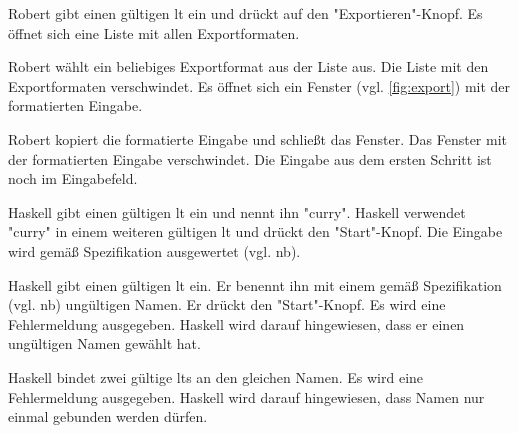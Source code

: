 \documentclass[parskip=full,11pt,twoside]{scrartcl}
\begin{document}

{Robert gibt einen gültigen \gls{lt} ein und drückt auf den "Exportieren"-Knopf.}
{Es öffnet sich eine Liste mit allen Exportformaten.}

{Robert wählt ein beliebiges Exportformat aus der Liste aus.}
{Die Liste mit den Exportformaten verschwindet.
Es öffnet sich ein Fenster (vgl. \cref{fig:export}) mit der formatierten Eingabe.}

{Robert kopiert die formatierte Eingabe und schließt das Fenster.}
{Das Fenster mit der formatierten Eingabe verschwindet. 
 Die Eingabe aus dem ersten Schritt ist noch im Eingabefeld.}
 

{Haskell gibt einen gültigen \gls{lt} ein und nennt ihn "curry".
 Haskell verwendet "curry" in einem weiteren gültigen \gls{lt} und drückt den "Start"-Knopf.}
{Die Eingabe wird gemäß Spezifikation ausgewertet (vgl. \gls{nb}).}

{Haskell gibt einen gültigen \gls{lt} ein.
 Er benennt ihn mit einem gemäß Spezifikation (vgl. \gls{nb}) ungültigen Namen.
 Er drückt den "Start"-Knopf.}
{Es wird eine Fehlermeldung ausgegeben.
 Haskell wird darauf hingewiesen, dass er einen ungültigen Namen gewählt hat.}

{Haskell bindet zwei gültige \glspl{lt} an den gleichen Namen.}
{Es wird eine Fehlermeldung ausgegeben. Haskell wird darauf hingewiesen, dass Namen
nur einmal gebunden werden dürfen.}
\end{document}
